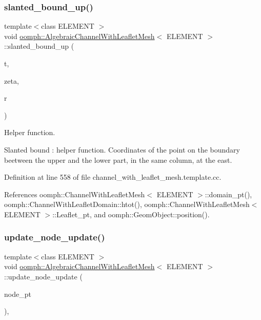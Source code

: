 \subsubsection{\texorpdfstring{slanted\+\_\+bound\+\_\+up()}{slanted\_bound\_up()}}
{\footnotesize\ttfamily template$<$class E\+L\+E\+M\+E\+NT $>$ \\
void \hyperlink{classoomph_1_1AlgebraicChannelWithLeafletMesh}{oomph\+::\+Algebraic\+Channel\+With\+Leaflet\+Mesh}$<$ E\+L\+E\+M\+E\+NT $>$\+::slanted\+\_\+bound\+\_\+up (\begin{DoxyParamCaption}\item[{const unsigned \&}]{t,  }\item[{const \hyperlink{classoomph_1_1Vector}{Vector}$<$ double $>$ \&}]{zeta,  }\item[{\hyperlink{classoomph_1_1Vector}{Vector}$<$ double $>$ \&}]{r }\end{DoxyParamCaption})\hspace{0.3cm}{\ttfamily [protected]}}



Helper function. 

Slanted bound \+: helper function. Coordinates of the point on the boundary beetween the upper and the lower part, in the same column, at the east. 

Definition at line 558 of file channel\+\_\+with\+\_\+leaflet\+\_\+mesh.\+template.\+cc.



References oomph\+::\+Channel\+With\+Leaflet\+Mesh$<$ E\+L\+E\+M\+E\+N\+T $>$\+::domain\+\_\+pt(), oomph\+::\+Channel\+With\+Leaflet\+Domain\+::htot(), oomph\+::\+Channel\+With\+Leaflet\+Mesh$<$ E\+L\+E\+M\+E\+N\+T $>$\+::\+Leaflet\+\_\+pt, and oomph\+::\+Geom\+Object\+::position().

\mbox{\label{classoomph_1_1AlgebraicChannelWithLeafletMesh_ace3a90b4e530c75bec8301e2291151eb}} 
\subsubsection{\texorpdfstring{update\+\_\+node\+\_\+update()}{update\_node\_update()}}
{\footnotesize\ttfamily template$<$class E\+L\+E\+M\+E\+NT $>$ \\
void \hyperlink{classoomph_1_1AlgebraicChannelWithLeafletMesh}{oomph\+::\+Algebraic\+Channel\+With\+Leaflet\+Mesh}$<$ E\+L\+E\+M\+E\+NT $>$\+::update\+\_\+node\+\_\+update (\begin{DoxyParamCaption}\item[{\hyperlink{classoomph_1_1AlgebraicNode}{Algebraic\+Node} $\ast$\&}]{node\+\_\+pt }\end{DoxyParamCaption})\hspace{0.3cm}{\ttfamily [inline]}, {\ttfamily [virtual]}}




